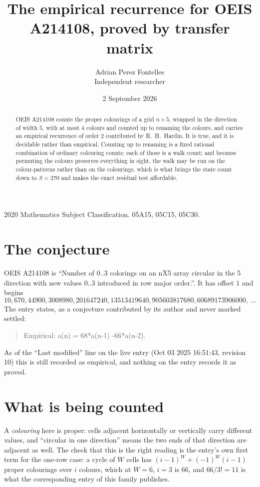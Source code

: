 \documentclass[11pt,a4paper]{article}
\title{The empirical recurrence for OEIS A214108, proved by transfer matrix}
\author{Adrian Perez Fontelles\\ \small Independent researcher}
\date{2 September 2026}
\theoremstyle{plain}
\theoremstyle{definition}
\begin{document}
\maketitle

\begin{abstract}
OEIS A214108 counts the proper colourings of a grid $n\times5$, wrapped in the direction of width $5$, with at most $4$ colours and
counted up to renaming the colours, and carries an empirical recurrence of order $2$
contributed by R.~H.~Hardin. It is true, and it is decidable rather than empirical. Counting
up to renaming is a fixed rational combination of ordinary colouring counts; each of those is
a walk count; and because permuting the colours preserves everything in sight, the walk may be
run on the colour-patterns rather than on the colourings, which is what brings the state count
down to $S=270$ and makes the exact residual test affordable.
\end{abstract}

\noindent\small 2020 Mathematics Subject Classification. 05A15, 05C15, 05C30.\normalsize

\section{The conjecture}

OEIS A214108 is ``Number of 0..3 colorings on an nX5 array circular in the 5 direction with new values 0..3 introduced in row major order.''. It has offset $1$ and begins
\[
10, 670, 44900, 3008980, 201647240, 13513419640, 905603817680, 60689173906000,\ \dots
\]
The entry states, as a conjecture contributed by its author and never marked settled:
\begin{quote}
Empirical: a(n) = 68*a(n-1) -66*a(n-2).
\end{quote}
As of the ``Last modified'' line on the live entry (Oct 03 2025 16:51:43, revision 10) this is still
recorded as empirical, and nothing on the entry records it as proved.

\section{What is being counted}

A \emph{colouring} here is proper: cells adjacent horizontally or vertically carry different
values, and ``circular in one direction'' means the two ends of that direction are adjacent as
well. The check that this is the right reading is the entry's own first term for the
one-row case: a cycle of $W$ cells has $(i-1)^W+(-1)^W(i-1)$ proper colourings over $i$
colours, which at $W=6$, $i=3$ is $66$, and $66/3!=11$ is what the corresponding entry of this
family publishes.
\end{document}
